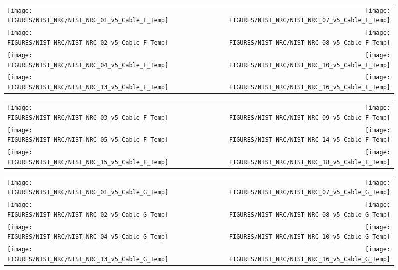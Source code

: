 
\begin{figure}[h!]
\begin{tabular*}{\textwidth}{l@{\extracolsep{\fill}}r}
\texttt{[image: FIGURES/NIST\_NRC/NIST\_NRC\_01\_v5\_Cable\_F\_Temp]} &
\texttt{[image: FIGURES/NIST\_NRC/NIST\_NRC\_07\_v5\_Cable\_F\_Temp]} \\
\texttt{[image: FIGURES/NIST\_NRC/NIST\_NRC\_02\_v5\_Cable\_F\_Temp]} &
\texttt{[image: FIGURES/NIST\_NRC/NIST\_NRC\_08\_v5\_Cable\_F\_Temp]} \\
\texttt{[image: FIGURES/NIST\_NRC/NIST\_NRC\_04\_v5\_Cable\_F\_Temp]} &
\texttt{[image: FIGURES/NIST\_NRC/NIST\_NRC\_10\_v5\_Cable\_F\_Temp]} \\
\texttt{[image: FIGURES/NIST\_NRC/NIST\_NRC\_13\_v5\_Cable\_F\_Temp]} &
\texttt{[image: FIGURES/NIST\_NRC/NIST\_NRC\_16\_v5\_Cable\_F\_Temp]}
\end{tabular*}
\label{NIST_NRC_Cable_F_Closed}
\end{figure}

\begin{figure}[h!]
\begin{tabular*}{\textwidth}{l@{\extracolsep{\fill}}r}
\texttt{[image: FIGURES/NIST\_NRC/NIST\_NRC\_03\_v5\_Cable\_F\_Temp]} &
\texttt{[image: FIGURES/NIST\_NRC/NIST\_NRC\_09\_v5\_Cable\_F\_Temp]} \\
\texttt{[image: FIGURES/NIST\_NRC/NIST\_NRC\_05\_v5\_Cable\_F\_Temp]} &
\texttt{[image: FIGURES/NIST\_NRC/NIST\_NRC\_14\_v5\_Cable\_F\_Temp]} \\
\texttt{[image: FIGURES/NIST\_NRC/NIST\_NRC\_15\_v5\_Cable\_F\_Temp]} &
\texttt{[image: FIGURES/NIST\_NRC/NIST\_NRC\_18\_v5\_Cable\_F\_Temp]}
\end{tabular*}
\label{NIST_NRC_Cable_F_Open}
\end{figure}


\begin{figure}[h!]
\begin{tabular*}{\textwidth}{l@{\extracolsep{\fill}}r}
\texttt{[image: FIGURES/NIST\_NRC/NIST\_NRC\_01\_v5\_Cable\_G\_Temp]} &
\texttt{[image: FIGURES/NIST\_NRC/NIST\_NRC\_07\_v5\_Cable\_G\_Temp]} \\
\texttt{[image: FIGURES/NIST\_NRC/NIST\_NRC\_02\_v5\_Cable\_G\_Temp]} &
\texttt{[image: FIGURES/NIST\_NRC/NIST\_NRC\_08\_v5\_Cable\_G\_Temp]} \\
\texttt{[image: FIGURES/NIST\_NRC/NIST\_NRC\_04\_v5\_Cable\_G\_Temp]} &
\texttt{[image: FIGURES/NIST\_NRC/NIST\_NRC\_10\_v5\_Cable\_G\_Temp]} \\
\texttt{[image: FIGURES/NIST\_NRC/NIST\_NRC\_13\_v5\_Cable\_G\_Temp]} &
\texttt{[image: FIGURES/NIST\_NRC/NIST\_NRC\_16\_v5\_Cable\_G\_Temp]}
\end{tabular*}
\label{NIST_NRC_Cable_G_Closed}
\end{figure}


